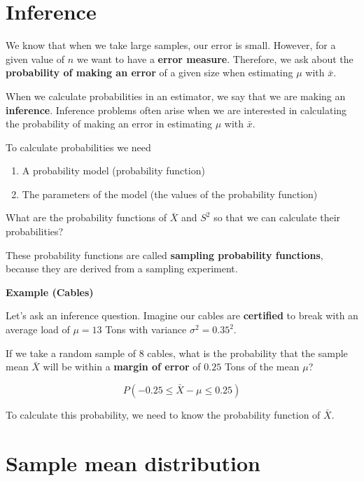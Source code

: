 \documentclass[
]{book}
\begin{document}
\hypertarget{inference}{%
\section{Inference}\label{inference}}

We know that when we take large samples, our error is small. However, for a given value of \(n\) we want to have a \textbf{error measure}. Therefore, we ask about the \textbf{probability of making an error} of a given size when estimating \(\mu\) with \(\bar{x}\).

When we calculate probabilities in an estimator, we say that we are making an \textbf{inference}. Inference problems often arise when we are interested in calculating the probability of making an error in estimating \(\mu\) with \(\bar{x}\).

To calculate probabilities we need

\begin{enumerate}
\def\labelenumi{\arabic{enumi}.}
\item
  A probability model (probability function)
\item
  The parameters of the model (the values of the probability function)
\end{enumerate}

What are the probability functions of \(\bar{X}\) and \(S^2\) so that we can calculate their probabilities?

These probability functions are called \textbf{sampling probability functions}, because they are derived from a sampling experiment.

\textbf{Example (Cables)}

Let's ask an inference question. Imagine our cables are \textbf{certified} to break with an average load of \(\mu = 13\) Tons with variance \(\sigma^2=0.35^2\).

If we take a random sample of \(8\) cables, what is the probability that the sample mean \(\bar{X}\) will be within a \textbf{margin of error} of \(0.25\) Tons of the mean \(\mu\)?

\[P(- 0.25\leq \bar{X}-\mu \leq 0.25)\]

To calculate this probability, we need to know the probability function of \(\bar{X}\).

\hypertarget{sample-mean-distribution}{%
\section{Sample mean distribution}\label{sample-mean-distribution}}
\end{document}
